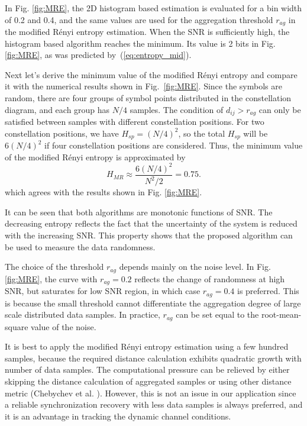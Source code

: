 \documentclass[journal,comsoc,onecolumn, 12pt,draftclsnofoot]{IEEEtran}
\begin{document}
In Fig. \ref{fig:MRE}, the 2D histogram based estimation is evaluated for a bin width of 0.2 and 0.4, and the same values are used for the aggregation threshold \(r_{ag}\) in the modified R\'enyi entropy estimation.
When the SNR is sufficiently high, the histogram based algorithm reaches the minimum. 
Its value is 2 bits in Fig. \ref{fig:MRE}, as was predicted by~(\ref{eq:entropy_mid}).

Next let's derive the minimum value of the modified R\'enyi entropy and compare it with the numerical results shown in Fig.~\ref{fig:MRE}.
Since the symbols are random, there are four groups of symbol points distributed in the constellation diagram, and each group has \(N/4\) samples.
The condition of $d_{ij}>r_{ag}$ can only be satisfied between samples with different constellation positions.
For two constellation positions, we have $H_{sp} = (N/4)^2$, so the total $H_{sp}$ will be $6 (N/4)^2$ if four constellation positions are considered.
Thus, the minimum value of the modified R\'enyi entropy is approximated by
\begin{equation}
H_{MR} \approx \frac{ 6 \left(N/4\right)^2}{N^2/2}=0.75.
\label{eq:adEntQPSK}
\end{equation}
which agrees with the results shown in Fig. \ref{fig:MRE}.


It can be seen that both algorithms are monotonic functions of SNR.
The decreasing entropy reflects the fact that the uncertainty of the system is reduced with the increasing SNR.
This property shows that the proposed algorithm can be used to measure the data randomness.

The choice of the threshold \(r_{ag}\) depends mainly on the noise level.
In Fig. \ref{fig:MRE}, the curve with \(r_{ag}=0.2\) reflects the change of randomness at high SNR, but saturates for low SNR region, in which case \(r_{ag}=0.4\) is preferred.
This is because the small threshold cannot differentiate the aggregation degree of large scale distributed data samples.
In practice, $r_{ag}$ can be set equal to the root-mean-square value of the noise.

It is best to apply the modified R\'enyi entropy estimation using a few hundred samples,
because the required distance calculation exhibits quadratic growth with number of data samples. 
The computational pressure can be relieved by either skipping the distance calculation of aggregated samples or using other distance metric (Chebychev et al. \cite{Cha2007}).
However, this is not an issue in our application since a reliable synchronization  recovery with less data samples is always preferred, and it is an advantage in tracking the dynamic channel conditions. 
\end{document}
